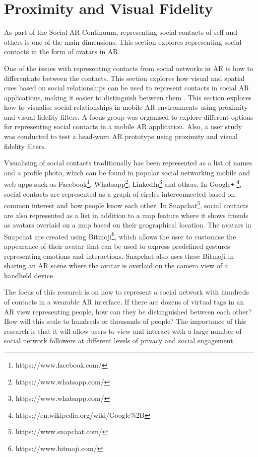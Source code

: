 \section{Proximity and Visual Fidelity}
\label{sec:contacts:visualising}

As part of the Social AR Continuum, representing social contacts of self and others is one of the main dimensions. This section explores representing social contacts in the form of avatars in AR. 

One of the issues with representing contacts from social networks in AR is how to differentiate between the contacts. This section explores how visual and spatial cues based on social relationships can be used to represent contacts in social AR applications, making it easier to distinguish between them \cite{Nassani2017b}. This section explores how to visualise social relationships in mobile AR environments using proximity and visual fidelity filters. A focus group was organised to explore different options for representing social contacts in a mobile AR application. Also, a user study was conducted to test a head-worn AR prototype using proximity and visual fidelity filters. 

Visualising of social contacts traditionally has been represented as a list of names and a profile photo, which can be found in popular social networking mobile and web apps such as Facebook\footnote{https://www.facebook.com/}, Whatsapp\footnote{https://www.whatsapp.com/}, LinkedIn\footnote{https://www.whatsapp.com/} and others. In Google\texttt{+} \footnote{https://en.wikipedia.org/wiki/Google\%2B}, social contacts are represented as a graph of circles interconnected based on common interest and how people know each other. In Snapchat\footnote{https://www.snapchat.com/}, social contacts are also represented as a list in addition to a map feature where it shows friends as avatars overlaid on a map based on their geographical location. The avatars in Snapchat are created using Bitmoji\footnote{https://www.bitmoji.com/}, which allows the user to customise the appearance of their avatar that can be used to express predefined gestures representing emotions and interactions. Snapchat also uses these Bitmoji in sharing an AR scene where the avatar is overlaid on the camera view of a handheld device. 

The focus of this research is on how to represent a social network with hundreds of contacts in a wearable AR interface. If there are dozens of virtual tags in an AR view representing people, how can they be distinguished between each other? How will this scale to hundreds or thousands of people? The importance of this research is that it will allow users to view and interact with a large number of social network followers at different levels of privacy and social engagement.

